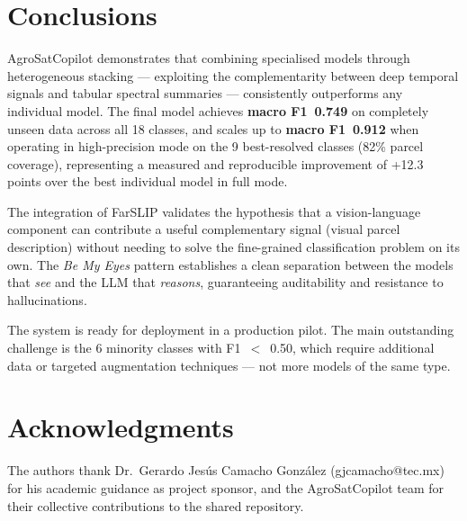 \documentclass{article}
\begin{document}
\section{Conclusions}

AgroSatCopilot demonstrates that combining specialised models through
heterogeneous stacking --- exploiting the complementarity between deep
temporal signals and tabular spectral summaries --- consistently outperforms
any individual model. The final model achieves \textbf{macro F1~0.749} on
completely unseen data across all 18 classes, and scales up to \textbf{macro
F1~0.912} when operating in high-precision mode on the 9 best-resolved
classes (82\% parcel coverage), representing a measured and reproducible
improvement of +12.3 points over the best individual model in full mode.

The integration of FarSLIP validates the hypothesis that a vision-language
component can contribute a useful complementary signal (visual parcel
description) without needing to solve the fine-grained classification
problem on its own. The \textit{Be My Eyes} pattern establishes a clean
separation between the models that \textit{see} and the LLM that
\textit{reasons}, guaranteeing auditability and resistance to
hallucinations.

The system is ready for deployment in a production pilot. The main
outstanding challenge is the 6 minority classes with F1~$<$~0.50, which
require additional data or targeted augmentation techniques --- not more
models of the same type.

\section*{Acknowledgments}
The authors thank Dr.\ Gerardo Jes\'us Camacho Gonz\'alez
(gjcamacho@tec.mx) for his academic guidance as project sponsor, and the
AgroSatCopilot team for their collective contributions to the shared
repository.
\end{document}
